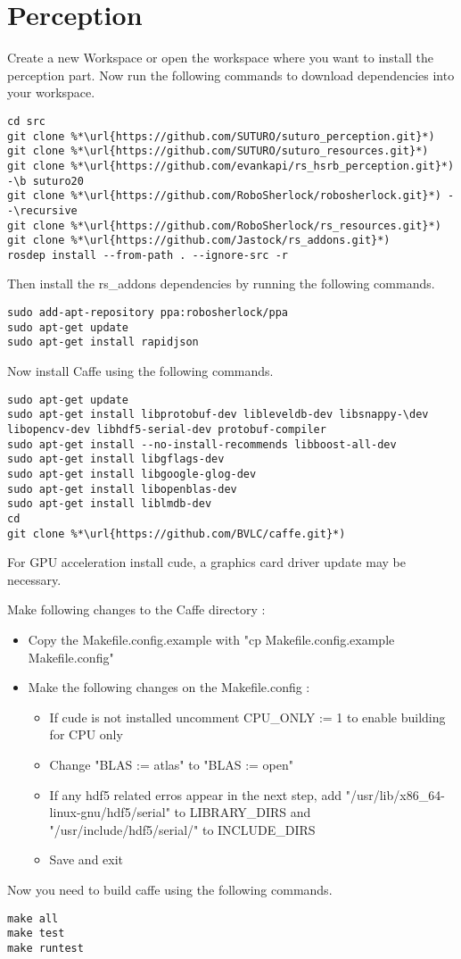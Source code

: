 \documentclass[main.tex]{subfiles}
\begin{document}
 \section{Perception}
 Create a new Workspace or open the workspace where you want to install the perception part. Now run the following commands to download dependencies into your workspace.
 
 \begin{lstlisting}
cd src
git clone %*\url{https://github.com/SUTURO/suturo_perception.git}*)
git clone %*\url{https://github.com/SUTURO/suturo_resources.git}*) 
git clone %*\url{https://github.com/evankapi/rs_hsrb_perception.git}*) -\b suturo20
git clone %*\url{https://github.com/RoboSherlock/robosherlock.git}*) --\recursive
git clone %*\url{https://github.com/RoboSherlock/rs_resources.git}*)
git clone %*\url{https://github.com/Jastock/rs_addons.git}*)
rosdep install --from-path . --ignore-src -r 
\end{lstlisting}
 
 Then install the rs\_addons dependencies by running the following commands.
 \begin{lstlisting}
sudo add-apt-repository ppa:robosherlock/ppa
sudo apt-get update
sudo apt-get install rapidjson 
\end{lstlisting}
 
 Now install Caffe using the following commands.
 \begin{lstlisting}
sudo apt-get update
sudo apt-get install libprotobuf-dev libleveldb-dev libsnappy-\dev libopencv-dev libhdf5-serial-dev protobuf-compiler
sudo apt-get install --no-install-recommends libboost-all-dev
sudo apt-get install libgflags-dev
sudo apt-get install libgoogle-glog-dev
sudo apt-get install libopenblas-dev
sudo apt-get install liblmdb-dev
cd 
git clone %*\url{https://github.com/BVLC/caffe.git}*)
\end{lstlisting}
 
 For GPU acceleration install cude, a graphics card driver update may be necessary.
 
 Make following changes to the Caffe directory : 
 \begin{itemize}
 \item Copy the Makefile.config.example with "cp Makefile.config.example Makefile.config"
 \item Make the following changes on the Makefile.config :
 	\begin{itemize}
 	\item If cude is not installed uncomment CPU\_ONLY := 1 to enable building for CPU only
 	\item Change "BLAS := atlas" to "BLAS := open"
 	\item If any hdf5 related erros appear in the next step, add "/usr/lib/x86\_64-linux-gnu/hdf5/serial" to LIBRARY\_DIRS and "/usr/include/hdf5/serial/" to INCLUDE\_DIRS
 	\item Save and exit
 	\end{itemize}
 	
 \end{itemize}
Now you need to build caffe using the following commands.
\begin{lstlisting}
make all
make test
make runtest  
\end{lstlisting}

 
\end{document}
